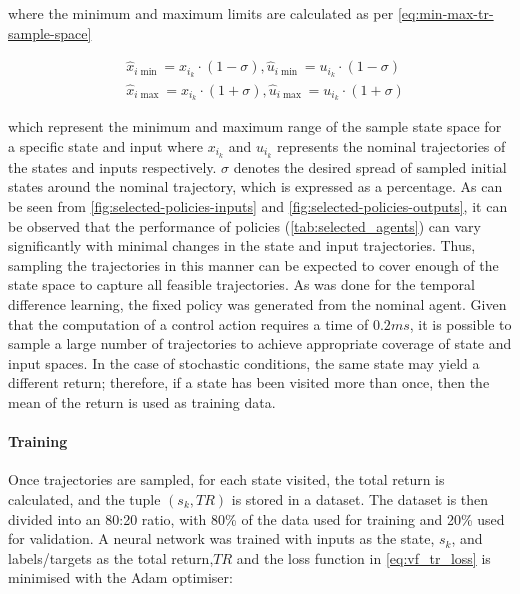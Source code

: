 where the minimum and maximum limits are calculated as per \autoref{eq:min-max-tr-sample-space}

\begin{equation}\label{eq:min-max-tr-sample-space}
\begin{aligned}
    &\hat{x}_{i\min} = x_{i_k} \cdot (1-\sigma),\hat{u}_{i\min} = u_{i_k} \cdot (1-\sigma)\\
    &\hat{x}_{i\max} = x_{i_k} \cdot (1+\sigma),\hat{u}_{i\max} = u_{i_k} \cdot (1+\sigma)
\end{aligned}
\end{equation}

which represent the minimum and maximum range of the sample state space for a specific state and input where ${x}_{i_k}$ and ${u}_{i_k}$ represents the nominal trajectories of the states and inputs respectively. $\sigma$ denotes the desired spread of sampled initial states around the nominal trajectory, which is expressed as a percentage. As can be seen from \autoref{fig:selected-policies-inputs} and \autoref{fig:selected-policies-outputs}, it can be observed that the performance of policies (\autoref{tab:selected_agents}) can vary significantly with minimal changes in the state and input trajectories. Thus, sampling the trajectories in this manner can be expected to cover enough of the state space to capture all feasible trajectories. As was done for the temporal difference learning, the fixed policy was generated from the nominal agent. Given that the computation of a control action requires a time of $0.2 ms$, it is possible to sample a large number of trajectories to achieve appropriate coverage of state and input spaces. In the case of stochastic conditions, the same state may yield a different return; therefore, if a state has been visited more than once, then the mean of the return is used as training data.

\paragraph{Training}
Once trajectories are sampled, for each state visited, the total return is calculated, and the tuple $(s_k,TR)$ is stored in a dataset. The dataset is then divided into an 80:20 ratio, with 80\% of the data used for training and 20\% used for validation. A neural network was trained with inputs as the state, $s_k$, and labels/targets as the total return,$TR$ and the loss function in \autoref{eq:vf_tr_loss} is minimised with the Adam optimiser:

